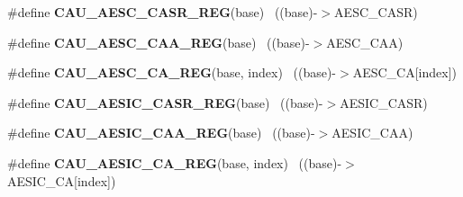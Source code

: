 \begin{DoxyCompactItemize}
\item 
\hypertarget{group___c_a_u___register___accessor___macros_ga056d5cfcfc30cf0248ed9fdbb532ab55}{}\#define {\bfseries C\+A\+U\+\_\+\+A\+E\+S\+C\+\_\+\+C\+A\+S\+R\+\_\+\+R\+E\+G}(base)                                ~((base)-\/$>$A\+E\+S\+C\+\_\+\+C\+A\+S\+R)\label{group___c_a_u___register___accessor___macros_ga056d5cfcfc30cf0248ed9fdbb532ab55}

\item 
\hypertarget{group___c_a_u___register___accessor___macros_ga930618ab32c8826be592a837b88f39fd}{}\#define {\bfseries C\+A\+U\+\_\+\+A\+E\+S\+C\+\_\+\+C\+A\+A\+\_\+\+R\+E\+G}(base)                                  ~((base)-\/$>$A\+E\+S\+C\+\_\+\+C\+A\+A)\label{group___c_a_u___register___accessor___macros_ga930618ab32c8826be592a837b88f39fd}

\item 
\hypertarget{group___c_a_u___register___accessor___macros_ga20d27f5bbb804d0a0a1aa38086b82583}{}\#define {\bfseries C\+A\+U\+\_\+\+A\+E\+S\+C\+\_\+\+C\+A\+\_\+\+R\+E\+G}(base,  index)                        ~((base)-\/$>$A\+E\+S\+C\+\_\+\+C\+A\mbox{[}index\mbox{]})\label{group___c_a_u___register___accessor___macros_ga20d27f5bbb804d0a0a1aa38086b82583}

\item 
\hypertarget{group___c_a_u___register___accessor___macros_ga4577f849126da6fdeae27d04991bde0b}{}\#define {\bfseries C\+A\+U\+\_\+\+A\+E\+S\+I\+C\+\_\+\+C\+A\+S\+R\+\_\+\+R\+E\+G}(base)                              ~((base)-\/$>$A\+E\+S\+I\+C\+\_\+\+C\+A\+S\+R)\label{group___c_a_u___register___accessor___macros_ga4577f849126da6fdeae27d04991bde0b}

\item 
\hypertarget{group___c_a_u___register___accessor___macros_ga8dd59c7f489f56fc8474131a21e85f16}{}\#define {\bfseries C\+A\+U\+\_\+\+A\+E\+S\+I\+C\+\_\+\+C\+A\+A\+\_\+\+R\+E\+G}(base)                                ~((base)-\/$>$A\+E\+S\+I\+C\+\_\+\+C\+A\+A)\label{group___c_a_u___register___accessor___macros_ga8dd59c7f489f56fc8474131a21e85f16}

\item 
\hypertarget{group___c_a_u___register___accessor___macros_ga3db348f704793cdf8dda4b160e4b89b4}{}\#define {\bfseries C\+A\+U\+\_\+\+A\+E\+S\+I\+C\+\_\+\+C\+A\+\_\+\+R\+E\+G}(base,  index)                      ~((base)-\/$>$A\+E\+S\+I\+C\+\_\+\+C\+A\mbox{[}index\mbox{]})\label{group___c_a_u___register___accessor___macros_ga3db348f704793cdf8dda4b160e4b89b4}


\end{DoxyCompactItemize}
